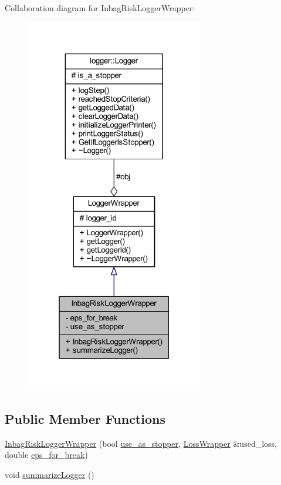 Collaboration diagram for Inbag\+Risk\+Logger\+Wrapper\+:\nopagebreak
\begin{figure}[H]
\begin{center}
\leavevmode
\includegraphics[width=220pt]{class_inbag_risk_logger_wrapper__coll__graph}
\end{center}
\end{figure}
\subsection*{Public Member Functions}
\begin{DoxyCompactItemize}
\item 
\mbox{\hyperlink{class_inbag_risk_logger_wrapper_a6b23be0fa48dd767089a8a11e340e784}{Inbag\+Risk\+Logger\+Wrapper}} (bool \mbox{\hyperlink{class_inbag_risk_logger_wrapper_aca25b80855d0f8dcf9b59a4d544ecca8}{use\+\_\+as\+\_\+stopper}}, \mbox{\hyperlink{class_loss_wrapper}{Loss\+Wrapper}} \&used\+\_\+loss, double \mbox{\hyperlink{class_inbag_risk_logger_wrapper_ae1731a184b5cae28fd5981ffd6daeec7}{eps\+\_\+for\+\_\+break}})
\item 
void \mbox{\hyperlink{class_inbag_risk_logger_wrapper_ad6c58bd912b715cd6ef3a82573f4b142}{summarize\+Logger}} ()
\end{DoxyCompactItemize}
